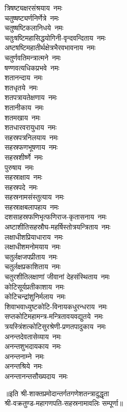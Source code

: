 \begin{multicols}{2}
\begin{flushleft}
त्रिषष्ट्यक्षरसंश्रयाय~नमः\\
चतुष्षष्ट्यर्णनिर्णेत्रे~नमः\\
चतुष्षष्टिकलानिधये~नमः\\
चतुःषष्टिमहासिद्धयोगिनी-वृन्दवन्दिताय~नमः\\
अष्टषष्टिमहातीर्थक्षेत्रभैरव\-भावनाय~नमः\\
चतुर्णवतिमन्त्रात्मने~नमः\\
षण्णवत्यधिकप्रभवे~नमः\\
शतानन्दाय~नमः\\
शतधृतये~नमः\\
शतपत्रायतेक्षणाय~नमः\hfill{}\\
शतानीकाय~नमः\\
शतमखाय~नमः\\
शतधारवरायुधाय~नमः\\
सहस्रपत्रनिलयाय~नमः\\
सहस्रफणभूषणाय~नमः\\
सहस्रशीर्ष्णे~नमः\\
पुरुषाय~नमः\\
सहस्राक्षाय~नमः\\
सहस्रपदे~नमः\\
सहस्रनामसंस्तुत्याय~नमः\hfill{}\\
सहस्राक्षबलापहाय~नमः\\
दशसाहस्रफणिभृत्फणिराज-कृतासनाय~नमः\\
अष्टाशीतिसहस्रौघ-महर्षिस्तोत्रयन्त्रिताय~नमः\\
लक्षाधीशप्रियाधाराय~नमः\\
लक्षाधीशमनोमयाय~नमः\\
चतुर्लक्षजपप्रीताय~नमः\\
चतुर्लक्षप्रकाशिताय~नमः\\
चतुरशीतिलक्षाणां जीवानां देहसंस्थिताय~नमः\\
कोटिसूर्यप्रतीकाशाय~नमः\\
कोटिचन्द्रांशुनिर्मलाय~नमः\hfill{}\\
शिवाभवाध्युष्टकोटि-विनायकधुरन्धराय~नमः\\
सप्तकोटिमहामन्त्र-मन्त्रितावयवद्युतये~नमः\\
त्रयस्त्रिंशत्कोटिसुरश्रेणी-प्रणतपादुकाय~नमः\\
अनन्तदेवतासेव्याय~नमः\\
अनन्तशुभदायकाय~नमः\\
अनन्तनाम्ने~नमः\\
अनन्तश्रिये~नमः\\
अनन्तानन्तसौख्यदाय~नमः\\
\end{flushleft}
\end{multicols}
॥इति श्री-शाक्तप्रमोदान्तर्गतगणेशतन्त्रादुद्धृता\\
श्री-वक्रतुण्ड-महागणपति-सहस्रनामावलिः सम्पूर्णा॥
